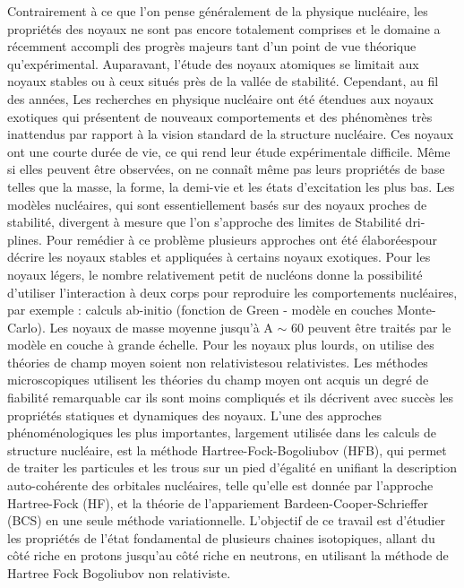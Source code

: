  Contrairement à ce que l'on pense généralement de la physique nucléaire, les propriétés des noyaux ne sont
pas encore totalement comprises et le domaine a récemment accompli des progrès majeurs tant d'un point de vue théorique
qu'expérimental.
 Auparavant, l'étude des noyaux atomiques se limitait aux noyaux stables ou à ceux situés près de la vallée
de stabilité. Cependant, au fil des années, \textcolor[rgb]{0.1254902,0.12941177,0.14117648}{Les recherches en physique
nucléaire ont été étendues aux noyaux exotiques qui }présentent de nouveaux comportements et des phénomènes très
inattendus par rapport à la vision standard de la structure nucléaire\textcolor[rgb]{0.1254902,0.12941177,0.14117648}{.
Ces noyaux ont une courte durée de vie, ce qui rend leur étude e}xpérimentale difficile. Même si elles peuvent être
observées, on ne connaît même pas leurs propriétés de base telles que la masse, la forme, la demi-vie et les états
d'excitation les plus bas.
 Les modèles nucléaires, qui sont essentiellement basés sur des noyaux proches de stabilité, divergent à
mesure que l'on s'approche des limites de Stabilité {\textquotedbl}dri-plines{\textquotedbl}. Pour remédier à ce
problème plusieurs approches ont été élaboréespour décrire les noyaux stables et appliquées à certains noyaux
exotiques.
 Pour les noyaux légers, le nombre relativement petit de nucléons donne la possibilité d'utiliser
l'interaction à deux corps pour reproduire les comportements nucléaires, par exemple : calculs ab-initio (fonction de
Green - modèle en couches Monte-Carlo). Les noyaux de masse moyenne jusqu'à A ${\sim}$ 60 peuvent être traités par le
modèle en couche à grande échelle. Pour les noyaux plus lourds, on utilise des théories de champ moyen soient non
relativistesou relativistes.
 Les méthodes microscopiques utilisent les théories du champ moyen ont acquis un degré de fiabilité
remarquable car ils sont moins compliqués et ils décrivent avec succès les propriétés statiques et dynamiques des
noyaux. L'une des approches phénoménologiques les plus importantes, largement utilisée dans les calculs de structure
nucléaire, est la méthode Hartree-Fock-Bogoliubov (HFB), qui permet de traiter les particules et les trous sur un pied
d'égalité en unifiant la description auto-cohérente des orbitales nucléaires, telle qu'elle est donnée par l'approche
Hartree-Fock (HF), et la théorie de l'appariement Bardeen-Cooper-Schrieffer (BCS) en une seule méthode variationnelle.
 L'objectif de ce travail est d'étudier les propriétés de l'état fondamental de plusieurs chaines
isotopiques, allant du côté riche en protons jusqu'au côté riche en neutrons, en utilisant la méthode de Hartree Fock
Bogoliubov non relativiste.
\thispagestyle{empty}



